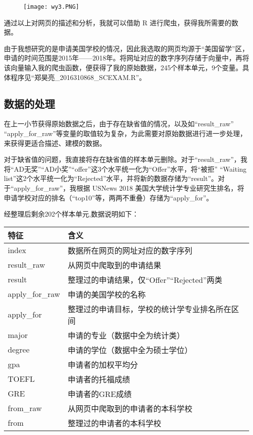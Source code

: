 \documentclass[UTF8,cs4size]{ctexart}
\begin{document}
\begin{figure}[h]
	\centering
	\texttt{[image: wy3.PNG]}
\end{figure}

\par 通过以上对网页的描述和分析，我就可以借助 R 进行爬虫，获得我所需要的数据。

\vspace{2ex}
\par 由于我想研究的是申请美国学校的情况，因此我选取的网页均源于“美国留学”区，申请的时间范围是2015年——2018年。将网址对应的数字序列存储于向量中，再将该向量输入我的爬虫函数，便获得了我的原始数据，245个样本单元，9个变量。具体程序见“郑昊亮\_2016310868\_SCEXAM.R”。

\subsection{\heiti 数据的处理}
\par 在上一小节获得原始数据之后，由于存在缺省值的情况，以及如“result\_raw” “apply\_for\_raw”等变量的取值较为复杂，为此需要对原始数据进行进一步处理，来获得更适合描述、建模的数据。
\par 对于缺省值的问题，我直接将存在缺省值的样本单元删除。对于“result\_raw”，我将“AD无奖”“AD小奖”“offer”这3个水平统一化为“Offer”水平，将“被拒” “Waiting list”这2个水平统一化为“Rejected”水平，并将新的数据存储为“result”。对于“apply\_for\_raw”，我根据 USNews 2018 美国大学统计学专业研究生排名，将申请学校对应的排名（“top10”等，两两不重叠）存储为“apply\_for”。
\par 经整理后剩余202个样本单元,数据说明如下：

\begin{table}[H]
\centering%
\begin{tabular}{C{3cm}C{10cm}}
\toprule
特征 & 含义 \\
\midrule
index & 数据所在网页的网址对应的数字序列 \\
result\_raw & 从网页中爬取到的申请结果 \\
result & 整理过的申请结果，仅“Offer”“Rejected”两类 \\
apply\_for\_raw & 申请的美国学校的名称 \\
apply\_for & 整理过的申请目标，学校的统计学专业排名所在区间 \\
major & 申请的专业（数据中全为统计类） \\
degree & 申请的学位（数据中全为硕士学位） \\
gpa & 申请者的加权平均分 \\
TOEFL & 申请者的托福成绩 \\
GRE & 申请者的GRE成绩 \\
from\_raw & 从网页中爬取到的申请者的本科学校 \\
from & 整理过的申请者的本科学校 \\
\bottomrule
\end{tabular}
\end{table}
\end{document}
